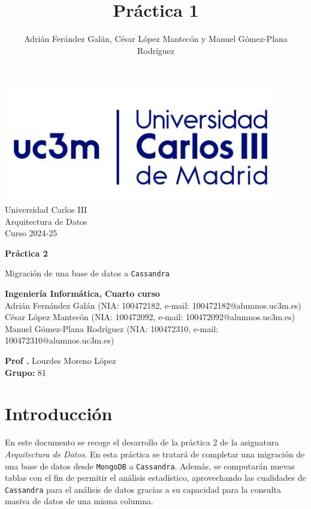 \documentclass[]{article}
\title{Práctica 1}
\author{Adrián Ferández Galán, César López Mantecón y Manuel Gómez-Plana Rodríguez}
\begin{document}
\begin{titlepage}
    \centering
   \includegraphics[width=0.9\textwidth]{uc3m.jpg} 
    {\Huge Universidad Carlos III\\
    
     \Large Arquitectura de Datos\\
     \vspace{0.5cm}
     Curso 2024-25}
    \vspace{2cm}

    {\Huge \textbf{Práctica 2} \par}
    \vspace{0.5cm}
    {\Large Migración de una base de datos a \texttt{Cassandra} \par}
    \vspace{8cm}

   \textbf{Ingeniería Informática, Cuarto curso}\\
    \vspace{0.2cm} 
    Adrián Fernández Galán       (NIA: 100472182, e-mail: 100472182@alumnos.uc3m.es)\\
    César López Mantecón         (NIA: 100472092, e-mail: 100472092@alumnos.uc3m.es)\\
    Manuel Gómez-Plana Rodríguez (NIA: 100472310, e-mail: 100472310@alumnos.uc3m.es)
    \vspace{0.5cm}

   
    \textbf{Prof .} Lourdes Moreno López\\
    
    \textbf{Grupo: } 81   
    
\end{titlepage}
\newpage

\renewcommand{\contentsname}{\centering Índice}
\tableofcontents

\newpage

\section{Introducción}
\label{sec:introduccion}
En este documento se recoge el desarrollo de la práctica 2 de la asignatura
\textit{Arquitectura de Datos}. En esta práctica se tratará de completar una
migración de una base de datos desde \texttt{MongoDB} a \texttt{Cassandra}.
Además, se computarán nuevas tablas con el fin de permitir el análisis
estadístico, aprovechando las cualidades de \texttt{Cassandra} para el análisis
de datos gracias a su capacidad para la consulta masiva de datos de una misma
columna.
\end{document}
